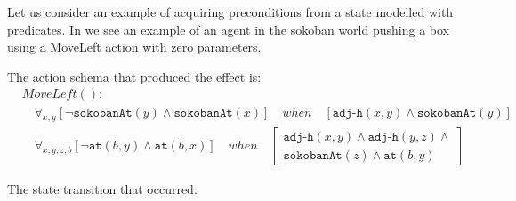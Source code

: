 \documentclass[../Master.tex]{subfiles}
\begin{document}
\begin{example}\label{ex:ca:sokoban-moveleft-action}
Let us consider an example of acquiring preconditions from a state modelled with predicates. In  we see an example of an agent in the sokoban world pushing a box using a MoveLeft action with zero parameters.

The action schema that produced the effect is:
\begin{align*}
&MoveLeft():&  \\
&\quad
	\forall_{x, y}
		\left[
			\neg\texttt{sokobanAt}(y) \land \texttt{sokobanAt}(x)
		\right]
		\quad when \quad
		\left[ \texttt{adj-h}(x,y) \land \texttt{sokobanAt}(y) \right]& \\
&\quad
	\forall_{x, y, z, b}
		\left[ \neg\texttt{at}(b,y) \land \texttt{at}(b,x) \right]
		\quad when \quad
		\left[
			\begin{gathered}
				 \texttt{adj-h}(x,y) \land \texttt{adj-h}(y,z) \land \\
					  \texttt{sokobanAt}(z) \land \texttt{at}(b, y)
			\end{gathered}
		\right] &
\end{align*}

The state transition that occurred:


\end{example}
\end{document}
